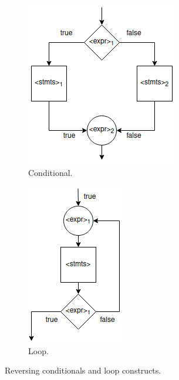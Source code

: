 \begin{figure}[H]
      \centering
      \begin{subfigure}[b]{0.4\textwidth}
            \centering
            \includegraphics[scale=0.5]{imgs/reversible-conditional.png}
            \caption{Conditional.}
      \end{subfigure}
      \hfill
      \begin{subfigure}[b]{0.4\textwidth}
            \centering
            \includegraphics[scale=0.5]{imgs/reversible-loop.png}
            \caption{Loop.}
      \end{subfigure}
      \caption{Reversing conditionals and loop constructs.}
      \label{fig:rev-flow-constructs}
\end{figure}

